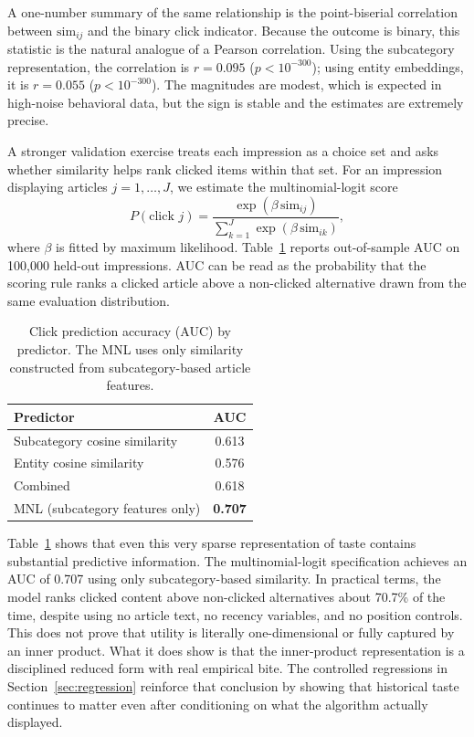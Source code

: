 \documentclass[11pt]{article}
\begin{document}
A one-number summary of the same relationship is the point-biserial correlation between $\text{sim}_{ij}$ and the binary click indicator. Because the outcome is binary, this statistic is the natural analogue of a Pearson correlation. Using the subcategory representation, the correlation is $r = 0.095$ ($p < 10^{-300}$); using entity embeddings, it is $r = 0.055$ ($p < 10^{-300}$). The magnitudes are modest, which is expected in high-noise behavioral data, but the sign is stable and the estimates are extremely precise.

A stronger validation exercise treats each impression as a choice set and asks whether similarity helps rank clicked items within that set. For an impression displaying articles $j=1,\ldots,J$, we estimate the multinomial-logit score
\[
P(\text{click }j)
=
\frac{\exp(\beta\,\text{sim}_{ij})}
{\sum_{k=1}^{J}\exp(\beta\,\text{sim}_{ik})},
\]
where $\beta$ is fitted by maximum likelihood. Table~\ref{tab:auc} reports out-of-sample AUC on 100,000 held-out impressions. AUC can be read as the probability that the scoring rule ranks a clicked article above a non-clicked alternative drawn from the same evaluation distribution.

\begin{table}[ht]
\centering
\caption{Click prediction accuracy (AUC) by predictor. The MNL uses only similarity constructed from subcategory-based article features.}
\label{tab:auc}
\begin{tabular}{lc}
\toprule
Predictor & AUC \\
\midrule
Subcategory cosine similarity & 0.613 \\
Entity cosine similarity & 0.576 \\
Combined & 0.618 \\
MNL (subcategory features only) & \textbf{0.707} \\
\bottomrule
\end{tabular}
\end{table}
\FloatBarrier

Table~\ref{tab:auc} shows that even this very sparse representation of taste contains substantial predictive information. The multinomial-logit specification achieves an AUC of 0.707 using only subcategory-based similarity. In practical terms, the model ranks clicked content above non-clicked alternatives about 70.7\% of the time, despite using no article text, no recency variables, and no position controls. This does not prove that utility is literally one-dimensional or fully captured by an inner product. What it does show is that the inner-product representation is a disciplined reduced form with real empirical bite. The controlled regressions in Section~\ref{sec:regression} reinforce that conclusion by showing that historical taste continues to matter even after conditioning on what the algorithm actually displayed.
\end{document}
